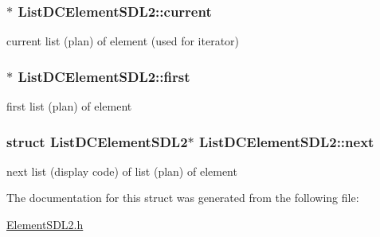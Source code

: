 \subsubsection[{\texorpdfstring{current}{current}}]{$\ast$ List\+D\+C\+Element\+S\+D\+L2\+::current}\hypertarget{structListDCElementSDL2_a1e39f2362d4eb953baec5eeaa7d6d8fd}{}\label{structListDCElementSDL2_a1e39f2362d4eb953baec5eeaa7d6d8fd}
current list (plan) of element (used for iterator) 
\subsubsection[{\texorpdfstring{first}{first}}]{$\ast$ List\+D\+C\+Element\+S\+D\+L2\+::first}\hypertarget{structListDCElementSDL2_a4226f765c0678e4e7cb79638eac95f35}{}\label{structListDCElementSDL2_a4226f765c0678e4e7cb79638eac95f35}
first list (plan) of element 
\subsubsection[{\texorpdfstring{next}{next}}]{\setlength{\rightskip}{0pt plus 5cm}struct {\bf List\+D\+C\+Element\+S\+D\+L2}$\ast$ List\+D\+C\+Element\+S\+D\+L2\+::next}\hypertarget{structListDCElementSDL2_a4b3b553c3ea6251594c4ab955da356a5}{}\label{structListDCElementSDL2_a4b3b553c3ea6251594c4ab955da356a5}
next list (display code) of list (plan) of element 

The documentation for this struct was generated from the following file\+:\begin{DoxyCompactItemize}
\item 
\hyperlink{ElementSDL2_8h}{Element\+S\+D\+L2.\+h}\end{DoxyCompactItemize}
